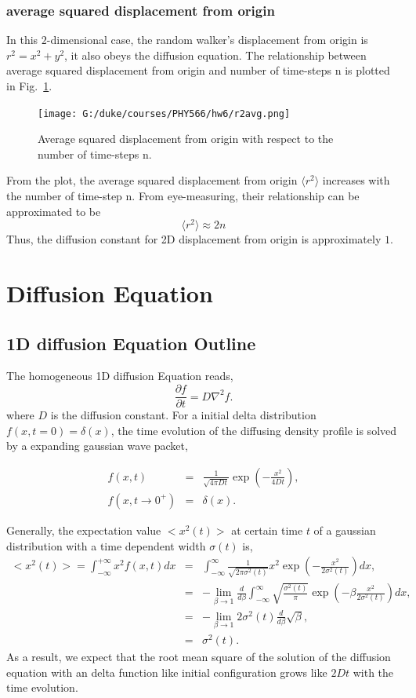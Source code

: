 \documentclass[a4paper,12pt]{article}
\begin{document}
\subsubsection{average squared displacement from origin}
In this $2$-dimensional case, the random walker's displacement from origin is $r^2 = x^2 + y^2$, it also obeys the diffusion equation. The relationship between average squared displacement from origin and number of time-steps n is plotted in Fig.~\ref{Fig:r2avg}. \\
\begin{figure}[!htb]
 \centering
  \texttt{[image: G:/duke/courses/PHY566/hw6/r2avg.png]}
 \caption{Average squared displacement from origin with respect to the number of time-steps n.}
  \label{Fig:r2avg}
\end{figure}
From the plot, the average squared displacement from origin $\langle r^2 \rangle$ increases with the number of time-step n. From eye-measuring, their relationship can be approximated to be $$\langle r^2 \rangle \approx 2n$$ Thus, the diffusion constant for 2D displacement from origin is approximately $1$.



\section{Diffusion Equation}
\subsection{1D diffusion Equation Outline}
\indent
\indent The homogeneous 1D diffusion Equation reads,
\begin{equation}
	\frac{\partial f}{\partial t} = D \nabla^2 f.
\end{equation}
where $D$ is the diffusion constant. For a initial delta distribution $f(x, t = 0) = \delta(x)$, the time evolution of the diffusing density profile is solved by a expanding gaussian wave packet,

\begin{eqnarray*}
	f(x,t) &=& \frac{1}{\sqrt{4\pi D t}} \exp{(-\frac{x^2}{4Dt})}, \\
	f(x, t \rightarrow 0^+) &=& \delta(x).
\end{eqnarray*}

Generally, the expectation value $<x^2(t)>$ at certain time $t$ of a gaussian distribution with a time dependent width $\sigma(t)$ is,
\begin{eqnarray*}
	<x^2(t)> = \int_{-\infty}^{+\infty} x^2 f(x,t) dx &=&  \int_{-\infty}^{\infty}  \frac{1}{\sqrt{2\pi \sigma^2(t)}} x^2 \exp{(-\frac{x^2}{2\sigma^2(t)})} dx, \\
	& = & -\lim_{\beta\rightarrow 1}\frac{d}{d\beta}\int_{-\infty}^{\infty}  \sqrt{\frac{\sigma^2(t)}{\pi}} \exp{(-\beta \frac{x^2}{2\sigma^2(t)})} dx, \\
	& = & -\lim_{\beta\rightarrow 1} 2\sigma^2(t)\frac{d}{d\beta}\sqrt{\beta}, \\
	& = & \sigma^2(t). 
\end{eqnarray*}
As a result, we expect that the root mean square of the solution of the diffusion equation with an delta function like initial configuration grows like $2Dt$ with the time evolution. 
\end{document}
